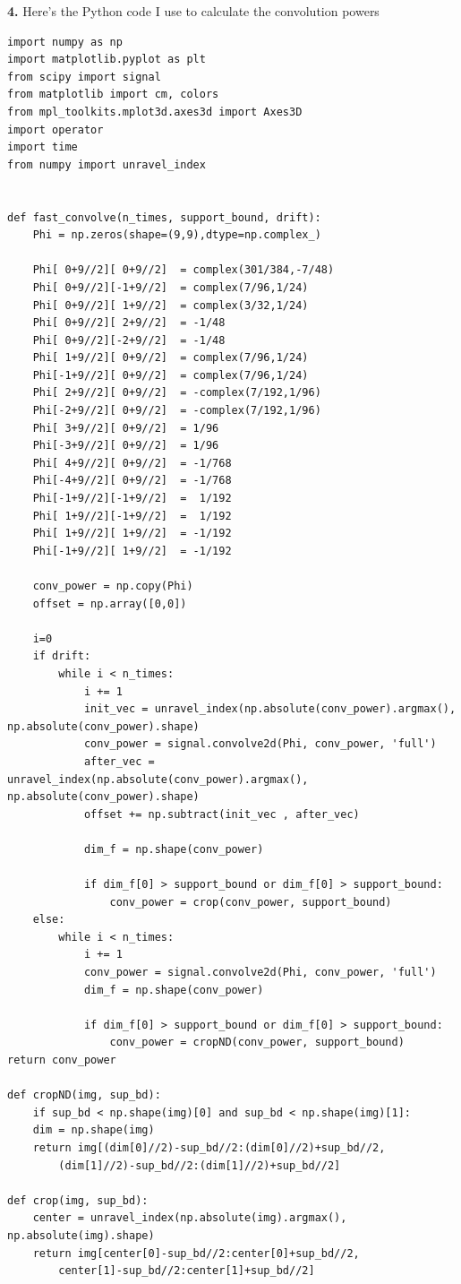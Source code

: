 \documentclass{article}
\theoremstyle{definition}
\begin{document}
\newpage

\noindent \textbf{4.} Here's the Python code I use to calculate the convolution powers
\begin{lstlisting}
import numpy as np
import matplotlib.pyplot as plt
from scipy import signal
from matplotlib import cm, colors
from mpl_toolkits.mplot3d.axes3d import Axes3D
import operator
import time
from numpy import unravel_index


def fast_convolve(n_times, support_bound, drift):
	Phi = np.zeros(shape=(9,9),dtype=np.complex_)

	Phi[ 0+9//2][ 0+9//2]  = complex(301/384,-7/48)
	Phi[ 0+9//2][-1+9//2]  = complex(7/96,1/24)     
	Phi[ 0+9//2][ 1+9//2]  = complex(3/32,1/24)      
	Phi[ 0+9//2][ 2+9//2]  = -1/48               
	Phi[ 0+9//2][-2+9//2]  = -1/48
	Phi[ 1+9//2][ 0+9//2]  = complex(7/96,1/24)
	Phi[-1+9//2][ 0+9//2]  = complex(7/96,1/24)
	Phi[ 2+9//2][ 0+9//2]  = -complex(7/192,1/96)
	Phi[-2+9//2][ 0+9//2]  = -complex(7/192,1/96)
	Phi[ 3+9//2][ 0+9//2]  = 1/96
	Phi[-3+9//2][ 0+9//2]  = 1/96
	Phi[ 4+9//2][ 0+9//2]  = -1/768
	Phi[-4+9//2][ 0+9//2]  = -1/768
	Phi[-1+9//2][-1+9//2]  =  1/192
	Phi[ 1+9//2][-1+9//2]  =  1/192
	Phi[ 1+9//2][ 1+9//2]  = -1/192
	Phi[-1+9//2][ 1+9//2]  = -1/192

	conv_power = np.copy(Phi)
	offset = np.array([0,0])

	i=0
	if drift:
		while i < n_times:
			i += 1
			init_vec = unravel_index(np.absolute(conv_power).argmax(), np.absolute(conv_power).shape)
			conv_power = signal.convolve2d(Phi, conv_power, 'full')
			after_vec = unravel_index(np.absolute(conv_power).argmax(), np.absolute(conv_power).shape)
			offset += np.subtract(init_vec , after_vec)

			dim_f = np.shape(conv_power)
	
			if dim_f[0] > support_bound or dim_f[0] > support_bound:
				conv_power = crop(conv_power, support_bound)
	else:
		while i < n_times:
			i += 1
			conv_power = signal.convolve2d(Phi, conv_power, 'full')
			dim_f = np.shape(conv_power)

			if dim_f[0] > support_bound or dim_f[0] > support_bound:
				conv_power = cropND(conv_power, support_bound)
return conv_power

def cropND(img, sup_bd):
	if sup_bd < np.shape(img)[0] and sup_bd < np.shape(img)[1]:
	dim = np.shape(img)
	return img[(dim[0]//2)-sup_bd//2:(dim[0]//2)+sup_bd//2,
		(dim[1]//2)-sup_bd//2:(dim[1]//2)+sup_bd//2]

def crop(img, sup_bd):
	center = unravel_index(np.absolute(img).argmax(), np.absolute(img).shape)
	return img[center[0]-sup_bd//2:center[0]+sup_bd//2,
		center[1]-sup_bd//2:center[1]+sup_bd//2]


\end{lstlisting}
\end{document}
